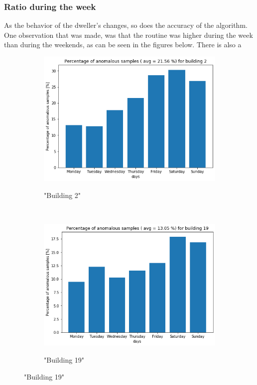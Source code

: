 \subsubsection{Ratio during the week} \label{sssec:ratio_week}

As the behavior of the dweller's changes, so does the accuracy of the algorithm. 
One observation that was made, was that the routine was higher during the week than during the weekends,
as can be seen in the figures below. There is also a 

\begin{figure}[H]
	\begin{subfigure}{.5\textwidth}
		\caption{"Building 2"}
		\includegraphics[width=1\linewidth]{../Figures/EC/b2week.png}
		\label{fig:ec_b2week}
	\end{subfigure}%
	~ 
	\begin{subfigure}{.5\textwidth}
		\caption{"Building 19"}
		\includegraphics[width=1\linewidth]{../Figures/EC/b19week.png}
		\label{fig:ec_b5week}
	\end{subfigure}%
    \bigskip


\end{figure}
